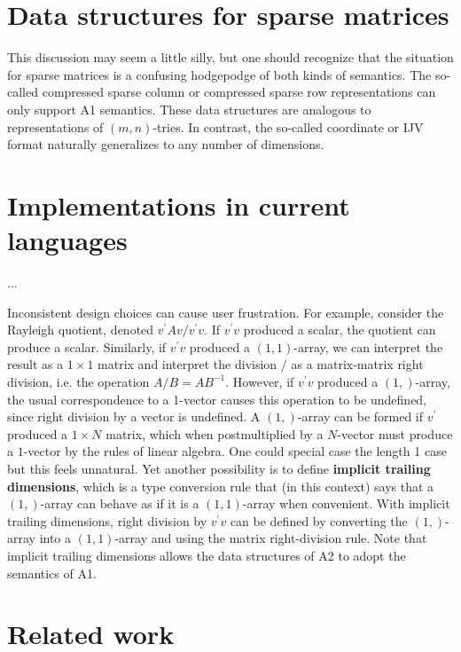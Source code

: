 \section{Data structures for sparse matrices}

This discussion may seem a little silly, but one should recognize
that the situation for sparse matrices is a confusing hodgepodge of
both kinds of semantics. The so-called compressed sparse column or
compressed sparse row representations can only support A1 semantics.
These data structures are analogous to representations of $\left(m,n\right)$-tries.
In contrast, the so-called coordinate or IJV format naturally generalizes
to any number of dimensions.

\section{Implementations in current languages}


...

Inconsistent design choices can cause user frustration. For example,
consider the Rayleigh quotient, denoted $v^{\prime}Av/v^{\prime}v$.
If $v^{\prime}v$ produced a scalar, the quotient can produce a scalar.
Similarly, if $v^{\prime}v$ produced a $\left(1,1\right)$-array,
we can interpret the result as a $1\times1$ matrix and interpret
the division $/$ as a matrix-matrix right division, i.e. the operation
$A/B=AB^{-1}$. However, if $v^{\prime}v$ produced a $\left(1,\right)$-array,
the usual correspondence to a 1-vector causes this operation to be
undefined, since right division by a vector is undefined. A $(1,)$-array
can be formed if $v^{\prime}$ produced a $1\times N$ matrix, which
when postmultiplied by a $N$-vector must produce a $1$-vector by
the rules of linear algebra. One could special case the length 1 case
but this feels unnatural. Yet another possibility is to define \textbf{implicit
trailing dimensions}, which is a type conversion rule that (in this
context) says that a $(1,)$-array can behave as if it is a $(1,1)$-array
when convenient. With implicit trailing dimensions, right division
by $v^{\prime}v$ can be defined by converting the $(1,)$-array into
a $(1,1)$-array and using the matrix right-division rule. Note that
implicit trailing dimensions allows the data structures of A2 to adopt
the semantics of A1.



\section{Related work}\label{sec:related}

